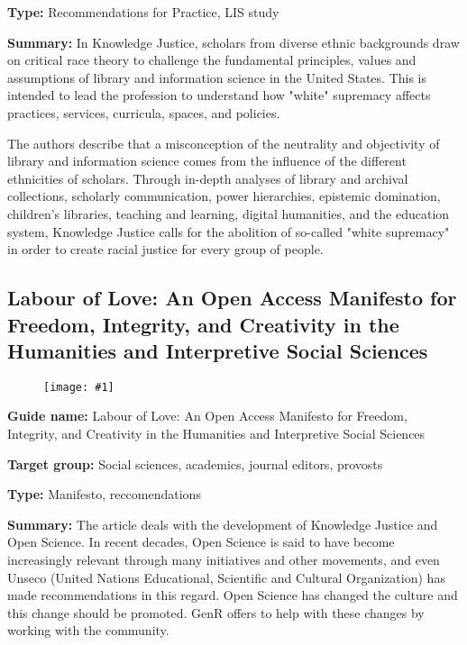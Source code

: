 \documentclass{article}
\newlength{\imgwidth}
\newcommand\scaledgraphics[2]{%
                
\settowidth{\imgwidth}{\texttt{[image: \#1]}}%
                
\setlength{\imgwidth}{\minof{\imgwidth}{#2\textwidth}}%
                
\texttt{[image: \#1]}%
                
}
\begin{document}
\textbf{Type:} Recommendations for Practice, LIS study


\textbf{Summary: }In Knowledge Justice, scholars from diverse ethnic backgrounds draw on critical race theory to challenge the fundamental principles, values and assumptions of library and information science in the United States. This is intended to lead the profession to understand how "white" supremacy affects practices, services, curricula, spaces, and policies.


The authors describe that a misconception of the neutrality and objectivity of library and information science comes from the influence of the different ethnicities of scholars. Through in-depth analyses of library and archival collections, scholarly communication, power hierarchies, epistemic domination, children's libraries, teaching and learning, digital humanities, and the education system, Knowledge Justice calls for the abolition of so-called "white supremacy" in order to create racial justice for every group of people.


\subsection{Labour of Love: An Open Access Manifesto for Freedom, Integrity, and Creativity in the Humanities and Interpretive Social Sciences}\label{H4374482}



\begin{center}
\begin{figure}
\scaledgraphics{e590694e-3a8f-4a2f-801f-704d7d8edbc0.png}{0.75}
\label{F3873651}
\end{figure}


\end{center}


\textbf{Guide name: }Labour of Love: An Open Access Manifesto for Freedom, Integrity, and Creativity in the Humanities and Interpretive Social Sciences\textbf{ }\autocite{pia_labour_2020}


\textbf{Target group: }Social sciences, academics, journal editors, provosts


\textbf{Type:} Manifesto, reccomendations


\textbf{Summary:} The article deals with the development of Knowledge Justice and Open Science. In recent decades, Open Science is said to have become increasingly relevant through many initiatives and other movements, and even Unseco (United Nations Educational, Scientific and Cultural Organization) has made recommendations in this regard. Open Science has changed the culture and this change should be promoted. GenR offers to help with these changes by working with the community.
\end{document}
